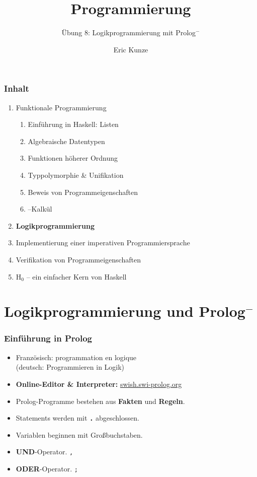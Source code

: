 \documentclass{beamer}
\renewcommand{\emph}[1]{\textbf{#1}}
\begin{document}
	
	\title{Programmierung}
	\subtitle{Übung 8: Logikprogrammierung mit Prolog${}^-$}
	\author{Eric Kunze}
	\date{}
	
	\maketitle
	


\begin{frame}[fragile] \frametitle{Inhalt}
	\begin{enumerate}
		\item Funktionale Programmierung
		\begin{enumerate}
			\item Einführung in Haskell: Listen
			\item Algebraische Datentypen
			\item Funktionen höherer Ordnung
			\item Typpolymorphie \& Unifikation
			\item Beweis von Programmeigenschaften
			\item \textlambda--Kalkül
		\end{enumerate}
		\item \textbf{Logikprogrammierung}
		\item Implementierung einer imperativen Programmiersprache
		\item Verifikation von Programmeigenschaften
		\item H${}_\text{0}$ -- ein einfacher Kern von Haskell
	\end{enumerate}
\end{frame}


\section{Logikprogrammierung und Prolog${}^-$}

\begin{frame} \frametitle{Einführung in Prolog}
	\small
	\begin{itemize}
		\item Französisch: programmation en logique \\
		(deutsch: Programmieren in Logik)
		\item \emph{Online-Editor \& Interpreter:} \url{swish.swi-prolog.org}
		\item Prolog-Programme bestehen aus \emph{Fakten} und \emph{Regeln}.
		\bigskip
		\item Statements werden mit \emph{\texttt{.}} abgeschlossen.
		\item Variablen beginnen mit Großbuchstaben.
		\bigskip
		\item \emph{UND}-Operator. \hspace{.2cm} \texttt{,}
		\item \emph{ODER}-Operator.\hspace{.2cm} \texttt{;}
	\end{itemize}
\end{frame}
\end{document}
